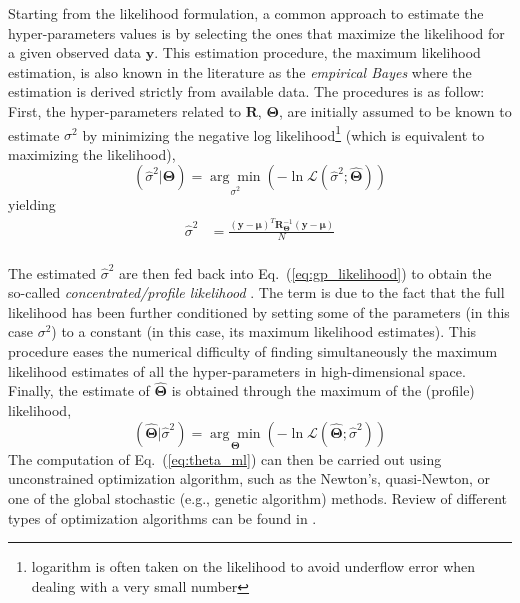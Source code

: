 Starting from the likelihood formulation, a common approach to estimate the hyper-parameters values is by selecting the ones that maximize the likelihood for a given observed data $\mathbf{y}$.
This estimation procedure, the maximum likelihood estimation, is also known in the literature as the \emph{empirical Bayes} \cite{Koehler1996} where the estimation is derived strictly from available data.
The procedures is as follow:
First, the hyper-parameters related to $\mathbf{R}$, $\boldsymbol{\Theta}$, are initially assumed to be known to estimate $\sigma^2$ by minimizing the negative log likelihood\footnote{logarithm is often taken on the likelihood to avoid underflow error when dealing with a very small number} (which is equivalent to maximizing the likelihood),
\begin{equation}
	\left(\hat{\sigma}^2 | \boldsymbol{\Theta}\right) = \underset{\sigma^2}{\arg\min} \left(- \ln \mathcal{L} (\hat{\sigma}^2 ; \hat{\boldsymbol{\Theta}})\right)
\label{eq:concentrated_likelihood_1}
\end{equation} 
yielding
\begin{equation}
	\begin{split}
		\hat{\sigma}^2           & = \frac{(\mathbf{y} - \boldsymbol{\mu})^T \mathbf{R}_{\boldsymbol{\Theta}}^{-1} (\mathbf{y} - \boldsymbol{\mu})}{N}\\
	\end{split}
\label{eq:sigma_ml}
\end{equation}

The estimated $\hat{\sigma}^2$ are then fed back into Eq.~(\ref{eq:gp_likelihood}) to obtain the so-called \emph{concentrated/profile likelihood} \cite{Cole2013,Kreutz2013}.
The term is due to the fact that the full likelihood has been further conditioned by setting some of the parameters 
(in this case $\sigma^2$) to a constant (in this case, its maximum likelihood estimates).
This procedure eases the numerical difficulty of finding simultaneously the maximum likelihood estimates of all the hyper-parameters in high-dimensional space.
Finally, the estimate of $\hat{\boldsymbol{\Theta}}$ is obtained through the maximum of the (profile) likelihood,
\begin{equation}
	\left(\hat{\boldsymbol{\Theta}} | \hat{\sigma}^2\right) = \underset{\boldsymbol{\Theta}}{\arg\min} \left(- \ln \mathcal{L} (\hat{\boldsymbol{\Theta}};\hat{\sigma}^2)\right)
	\label{eq:theta_ml}
\end{equation}
The computation of Eq.~(\ref{eq:theta_ml}) can then be carried out using unconstrained optimization algorithm, 
such as the Newton's, quasi-Newton, or one of the global stochastic (e.g., genetic algorithm) methods.
Review of different types of optimization algorithms can be found in \cite{Venter2010}.

